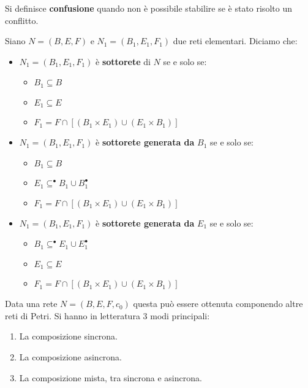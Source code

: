 Si definisce \textbf{confusione} quando non è possibile stabilire se è stato risolto un conflitto.
\begin{definizione}
    Siano $N = (B, E, F)$ e $N_1 = (B_1, E_1, F_1)$ due reti elementari. Diciamo che:
    \begin{itemize}
        \item $N_1 = (B_1, E_1, F_1)$ è \textbf{sottorete} di $N$ se e solo se:
        \begin{itemize}
            \item $B_1 \subseteq B$
            \item $E_1 \subseteq E$
            \item $F_1 = F \cap [(B_1 \times E_1) \cup (E_1 \times B_1)]$
        \end{itemize}
        \item $N_1 = (B_1, E_1, F_1)$ è \textbf{sottorete generata da} $B_1$ se e solo se:
        \begin{itemize}
            \item $B_1 \subseteq B$
            \item $E_1 \subseteq ^{\bullet} B_1 \cup B_1^{\bullet}$
            \item $F_1 = F \cap [(B_1 \times E_1) \cup (E_1 \times B_1)]$
        \end{itemize}
        \item $N_1 = (B_1, E_1, F_1)$ è \textbf{sottorete generata da} $E_1$ se e solo se:
        \begin{itemize}
            \item $B_1 \subseteq ^{\bullet} E_1 \cup E_1^{\bullet}$
            \item $E_1 \subseteq E$
            \item $F_1 = F \cap [(B_1 \times E_1) \cup (E_1 \times B_1)]$
        \end{itemize}
    \end{itemize}
\end{definizione}
Data una rete $N = (B,E, F, c_0)$ questa può essere ottenuta componendo altre reti di Petri. Si hanno in letteratura 3 modi principali:
\begin{enumerate}
    \item La composizione sincrona.
    \item La composizione asincrona.
    \item La composizione mista, tra sincrona e asincrona.
\end{enumerate}
